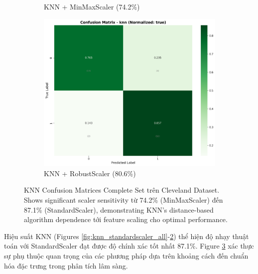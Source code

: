 \begin{figure}[H]
\begin{subfigure}[b]{0.315\textwidth}
\caption{KNN + MinMaxScaler (74.2\%)}
\label{fig:knn_minmaxscaler_all}
\end{subfigure}
\hfill
\begin{subfigure}[b]{0.315\textwidth}
\centering
\includegraphics[width=1\textwidth]{Result/cleveland_dataset/confusion_matrices/knn_numeric_dataset_RobustScaler.png}
\caption{KNN + RobustScaler (80.6\%)}
\label{fig:knn_robustscaler_all}
\end{subfigure}

\caption{KNN Confusion Matrices Complete Set trên Cleveland Dataset. Shows significant scaler sensitivity từ 74.2\% (MinMaxScaler) đến 87.1\% (StandardScaler), demonstrating KNN's distance-based algorithm dependence tới feature scaling cho optimal performance.}
\label{fig:knn_all_scalers_complete_analysis}
\end{figure}

Hiệu suất KNN (Figures \ref{fig:knn_standardscaler_all}-\ref{fig:knn_robustscaler_all}) thể hiện độ nhạy thuật toán với StandardScaler đạt được độ chính xác tốt nhất 87.1\%. Figure \ref{fig:knn_all_scalers_complete_analysis} xác thực sự phụ thuộc quan trọng của các phương pháp dựa trên khoảng cách đến chuẩn hóa đặc trưng trong phân tích lâm sàng.

